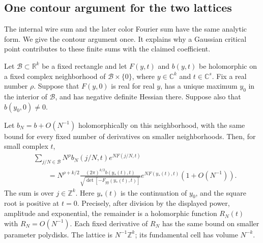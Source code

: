 \subsection{One contour argument for the two lattices}
\label{ca:lattice-method}

The internal wire sum and the later color Fourier sum have the same
analytic form. We give the contour argument once. It explains why a
Gaussian critical point contributes to these finite sums with the
claimed coefficient.

\begin{latticelemma}
Let $\mathcal B\subset\mathbb R^k$ be a fixed rectangle and let
$F(y,t)$ and $b(y,t)$ be holomorphic on a fixed complex neighborhood
of $\mathcal B\times\{0\}$, where $y\in\mathbb C^k$ and
$t\in\mathbb C^s$. Fix a real number $\rho$. Suppose that $F(y,0)$ is real for real
$y$, has a unique maximum $y_0$ in the interior of $\mathcal B$,
and has negative definite Hessian there. Suppose also that
$b(y_0,0)\ne0$.

Let $b_N=b+O(N^{-1})$ holomorphically on this neighborhood, with
the same bound for every fixed number of derivatives on smaller
neighborhoods. Then, for small complex $t$,
\begin{align*}
 &\sum_{j/N\in\mathcal B}
       N^\rho b_N(j/N,t)e^{NF(j/N,t)}\\
 &\qquad=
 N^{\rho+k/2}
 \frac{(2\pi)^{k/2}b(y_*(t),t)}
      {\sqrt{\det[-F_{yy}(y_*(t),t)]}}
 e^{NF(y_*(t),t)}(1+O(N^{-1})).
\end{align*}
The sum is over $j\in\mathbb Z^k$. Here $y_*(t)$ is the
continuation of $y_0$, and the square root is positive at $t=0$.
Precisely, after division by the displayed power, amplitude and
exponential, the remainder is a holomorphic function $R_N(t)$ with
$R_N=O(N^{-1})$. Each fixed derivative of $R_N$ has the same bound
on smaller parameter polydisks. The lattice is $N^{-1}\mathbb Z^k$;
its fundamental cell has volume $N^{-k}$.
\end{latticelemma}

